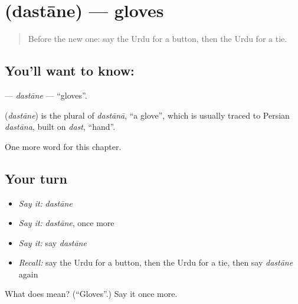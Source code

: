 \section[\texorpdfstring{\ur{دستانے} (dastāne)}{دستانے (dastāne)}]{ (dastāne) — gloves}

\label{lesson:UR-C122-dastane}



\begin{quote}
Before the new one: say the Urdu for a button, then the Urdu for a tie.
\end{quote}

\subsection*{You'll want to know: }
\textbf{} — \emph{dastāne} — \textquotedblleft{}gloves\textquotedblright{}.

\begin{cousinweb}
\textbf{} (\emph{dastāne}) is the plural of \emph{dastānā}, \textquotedblleft{}a glove\textquotedblright{}, which is usually traced to Persian \emph{dastāna}, built on \emph{dast}, \textquotedblleft{}hand\textquotedblright{}.
\end{cousinweb}

\begin{grammarlens}[title={What you've built}]
One more word for this chapter.
\end{grammarlens}

\subsection*{Your turn}
\begin{itemize}
\raggedright
  \item \emph{Say it:} \emph{dastāne}
  \item \emph{Say it:} \emph{dastāne}, once more
  \item \emph{Say it:} say \emph{dastāne}
  \item \emph{Recall:} say the Urdu for a button, then the Urdu for a tie, then say \emph{dastāne} again
\end{itemize}

\begin{tcolorbox}[breakable,colback=teal!4,colframe=teal!35!black,title={Before you move on}]
What does  mean? (\textquotedblleft{}Gloves\textquotedblright{}.) Say it once more.
\end{tcolorbox}
